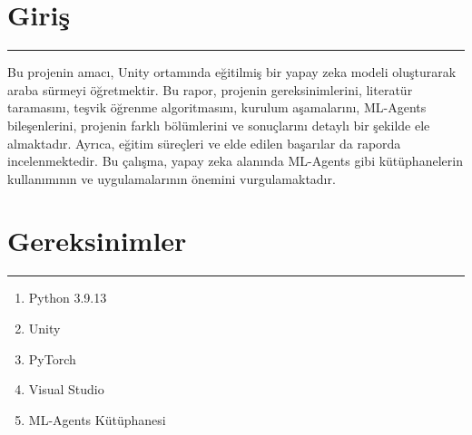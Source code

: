 \documentclass{article}
\begin{document}

\newpage

\section{Giriş}
\rule{\textwidth}{0.5pt}
\par Bu projenin amacı, Unity ortamında eğitilmiş bir yapay zeka modeli oluşturarak araba sürmeyi öğretmektir. Bu rapor, projenin gereksinimlerini, literatür taramasını, teşvik öğrenme algoritmasını, kurulum aşamalarını, ML-Agents bileşenlerini, projenin farklı bölümlerini ve sonuçlarını detaylı bir şekilde ele almaktadır. Ayrıca, eğitim süreçleri ve elde edilen başarılar da raporda incelenmektedir. Bu çalışma, yapay zeka alanında ML-Agents gibi kütüphanelerin kullanımının ve uygulamalarının önemini vurgulamaktadır.\\[5pt]

\section{Gereksinimler}
\rule{\textwidth}{0.5pt}
\begin{enumerate}
    \item Python 3.9.13
    \item Unity
    \item PyTorch
    \item Visual Studio  
    \item ML-Agents Kütüphanesi\\[5pt]
\end{enumerate}
\end{document}
